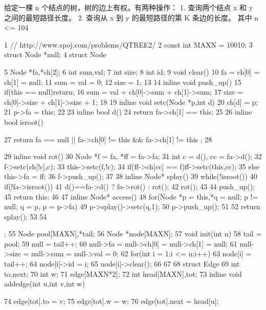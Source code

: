 \documentclass[11pt]{article}
\begin{document}
\begin{Code}
     给定一棵 n 个结点的树，树的边上有权。有两种操作：
     1. 查询两个结点 x 和 y 之间的最短路径长度。
     2. 查询从 x 到 y 的最短路径的第 K 条边的长度。
     其中 n <= 104

 1   // http://www.spoj.com/problems/QTREE2/
 2   const int MAXN = 10010;
 3   struct Node *null;
 4   struct Node{
 5       Node *fa,*ch[2];
 6       int sum,val;
 7       int size;
 8       int id;
 9       void clear(){
10           fa = ch[0] = ch[1] = null;
11           sum = val = 0;
12           size = 1;
13       }
14       inline void push_up(){
15           if(this == null)return;
16           sum = val + ch[0]->sum + ch[1]->sum;
17           size = ch[0]->size + ch[1]->size + 1;
18       }
19       inline void setc(Node *p,int d){
20           ch[d] = p;
21           p->fa = this;
22       }
23       inline bool d(){
24           return fa->ch[1] == this;
25       }
26       inline bool isroot(){


27              return fa == null || fa->ch[0] != this && fa->ch[1] != this
                   ;
28       }
29       inline void rot(){
30           Node *f = fa, *ff = fa->fa;
31           int c = d(), cc = fa->d();
32           f->setc(ch[!c],c);
33           this->setc(f,!c);
34           if(ff->ch[cc] == f)ff->setc(this,cc);
35           else this->fa = ff;
36           f->push_up();
37       }
38       inline Node* splay(){
39           while(!isroot()){
40               if(!fa->isroot())
41                   d()==fa->d() ? fa->rot() : rot();
42               rot();
43           }
44           push_up();
45           return this;
46       }
47       inline Node* access(){
48           for(Node *p = this,*q = null; p != null; q = p, p = p->fa){
49               p->splay()->setc(q,1);
50               p->push_up();
51           }
52           return splay();
53       }
54   };
55   Node pool[MAXN],*tail;
56   Node *node[MAXN];
57   void init(int n){
58       tail = pool;
59       null = tail++;
60       null->fa = null->ch[0] = null->ch[1] = null;
61       null->size = null->sum = null->val = 0;
62       for(int i = 1;i <= n;i++){
63           node[i] = tail++;
64           node[i]->id = i;
65           node[i]->clear();
66       }
67   }
68   struct Edge{
69       int to,next;
70       int w;
71   }edge[MAXN*2];
72   int head[MAXN],tot;
73   inline void addedge(int u,int v,int w){
74       edge[tot].to = v;
75       edge[tot].w = w;
76       edge[tot].next = head[u];


}
\end{Code}
\end{document}
